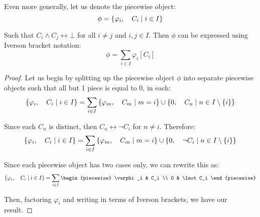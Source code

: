 \begin{theorem}
    Even more generally, let us denote the piecewise object:
    $$
        \phi=\{\varphi_i,\quad C_i\mid i\in I\}
    $$

    Such that $C_i\land C_j\leftrightarrow\bot$ for all $i\neq j$ and $i,j\in I$. Then $\phi$ can be expressed using Iverson bracket notation:
    $$
        \phi=\sum_{i\in I}{\varphi_i[C_i]}
    $$

    \begin{proof}
        Let us begin by splitting up the piecewise object $\phi$ into separate piecewise objects such that all but 1 piece is equal to $0$, in each:
        $$
            \{\varphi_i,\quad C_i\mid i\in I\}=\sum_{i\in I}{\{\varphi_m,\quad C_m\mid m=i\}\cup\{0,\quad C_n\mid n\in I\setminus\{i\}\}}
        $$

        Since each $C_n$ is distinct, then $C_n\leftrightarrow\lnot C_i$ for $n\neq i$. Therefore:
        $$
            \{\varphi_i,\quad C_i\mid i\in I\}=\sum_{i\in I}{\{\varphi_m,\quad C_m\mid m=i\}\cup\{0,\quad \lnot C_i\mid n\in I\setminus\{i\}\}}
        $$

        Since each piecewise object has two cases only, we can rewrite this as:
        $$
            \pwobj{\varphi_i}{C_i}{i\in I}=\sum_{i\in I}{\begin{piecewise}
                \varphi_i & C_i \\
                0 & \lnot C_i
            \end{piecewise}}
        $$

        Then, factoring $\varphi_i$ and writing in terms of Iverson brackets, we have our result.
    \end{proof}
\end{theorem}
\newpage